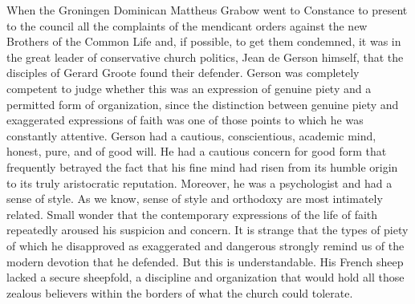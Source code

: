 When the Groningen Dominican Mattheus Grabow went to Constance to
present to the council all the complaints of the mendicant orders
against the new Brothers of the Common Life and, if possible, to get
them condemned, it was in the great leader of conservative church
politics, Jean de Gerson himself, that the disciples of Gerard Groote
found their defender. Gerson was completely
\protect\hypertarget{15_Chapter_Eight__RELIGIOUS_EXCITAT.xhtmlux5cux23page_224}{}{}competent
to judge whether this was an expression of genuine piety and a permitted
form of organization, since the distinction between genuine piety and
exaggerated expressions of faith was one of those points to which he was
constantly attentive. Gerson had a cautious, conscientious, academic
mind, honest, pure, and of good will. He had a cautious concern for good
form that frequently betrayed the fact that his fine mind had risen from
its humble origin to its truly aristocratic reputation. Moreover, he was
a psychologist and had a sense of style. As we know, sense of style and
orthodoxy are most intimately related. Small wonder that the
contemporary expressions of the life of faith repeatedly aroused his
suspicion and concern. It is strange that the types of piety of which he
disapproved as exaggerated and dangerous strongly remind us of the
modern devotion that he defended. But this is understandable. His French
sheep lacked a secure sheepfold, a discipline and organization that
would hold all those zealous believers within the borders of what the
church could tolerate.


